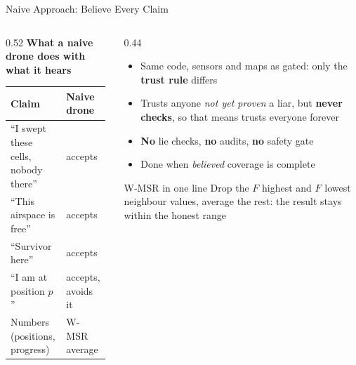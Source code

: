 \documentclass[aspectratio=169,10pt]{beamer}
\begin{document}
\begin{frame}{Naive Approach: Believe Every Claim}
\begin{columns}[c]
\begin{column}{0.52\textwidth}
\textbf{What a naive drone does with what it hears}\\[0.4em]
\footnotesize
\renewcommand{\arraystretch}{1.3}
\begin{tabular}{@{}p{0.6\linewidth} p{0.36\linewidth}@{}}
\toprule
\textbf{Claim} & \textbf{Naive drone} \\
\midrule
``I swept these cells, nobody there'' & \textcolor{bad}{accepts} \\
``This airspace is free''             & \textcolor{bad}{accepts} \\
``Survivor here''                     & \textcolor{bad}{accepts} \\
``I am at position $p$''              & \textcolor{bad}{accepts}, avoids it \\
Numbers (positions, progress)         & W-MSR average \\
\bottomrule
\end{tabular}
\end{column}
\begin{column}{0.44\textwidth}
\begin{itemize}
  \item Same code, sensors and maps as gated: only the \textbf{trust rule} differs
  \item Trusts anyone \emph{not yet proven} a liar, but \textbf{never checks}, so that means trusts everyone forever
  \item \textbf{No} lie checks, \textbf{no} audits, \textbf{no} safety gate
  \item Done when \emph{believed} coverage is complete
\end{itemize}
\vspace{0.3em}
\begin{block}{W-MSR in one line}
\small Drop the $F$ highest and $F$ lowest neighbour values, average the rest: the result stays within the honest range
\end{block}
\end{column}
\end{columns}
\end{frame}
\end{document}
